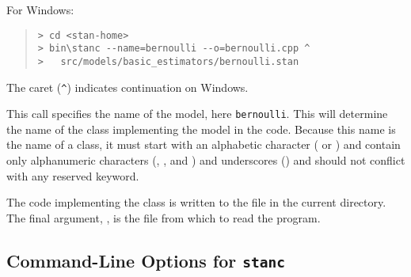 For Windows:
%
\begin{quote}
\begin{Verbatim}[fontshape=sl,fontsize=\small]
> cd <stan-home>
> bin\stanc --name=bernoulli --o=bernoulli.cpp ^
>   src/models/basic_estimators/bernoulli.stan 
\end{Verbatim}
\end{quote}
%
The caret (\Verb|^|) indicates continuation on Windows.

This call specifies the name of the model, here {\tt bernoulli}.
This will determine the name of the class implementing the model in
the \Cpp code.  Because this name is the name of a \Cpp class, it must
start with an alphabetic character ( or ) and
contain only alphanumeric characters (, , and
) and underscores (\code{\_}) and should not conflict with
any \Cpp reserved keyword.  

The \Cpp code implementing the class is written to the file
 in the current directory.  The final argument,
, is the file from which to read the \Stan
program.

\subsection{Command-Line Options for {\tt\bfseries stanc}}


